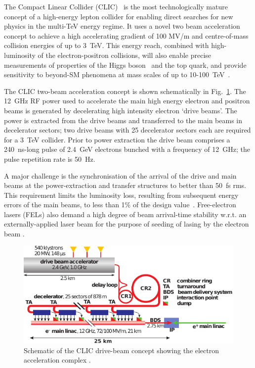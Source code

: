 \documentclass[%
 reprint,
 superscriptaddress,
 amsmath,
 amssymb,
 prl,
]{revtex4-1}
\begin{document}
The Compact Linear Collider (CLIC)~\cite{CLICCDR} is the most technologically 
mature concept of a high-energy lepton collider for enabling direct searches 
for new physics in the multi-TeV energy regime. It uses a novel two 
beam acceleration concept to achieve a high accelerating gradient of 100 MV/m 
and centre-of-mass collision energies of up to 3~TeV. This energy reach, 
combined with high-luminosity of the electron-positron collisions, will also 
enable precise measurements of properties of the Higgs boson~\cite{CLIC-Higgs} 
and the top quark, and provide sensitivity to beyond-SM phenomena at mass 
scales of up to 10-100~TeV~\cite{CLIC-staging}.

The CLIC two-beam acceleration concept is shown schematically in 
Fig.~\ref{fig:CLICLayout}. The 12~GHz RF power used to accelerate the main high 
energy electron and positron beams is generated by decelerating high intensity 
electron `drive beams'. The power is extracted from the drive beams and 
transferred to the main beams in decelerator sectors; two drive 
beams with 25 decelerator sectors each are required for a 3~TeV collider. Prior 
to power extraction the drive beam comprises a 240~ns-long pulse of 2.4~GeV 
electrons bunched with a frequency of 12~GHz; the pulse repetition rate is 
50~Hz.

A major challenge is the synchronisation of the arrival of the drive and main 
beams at the power-extraction and transfer structures to better than 50~fs rms. 
This requirement limits the luminosity loss, resulting from subsequent 
energy errors of the main beams, to less than 1\% of the design 
value~\cite{clicLumEq}. Free-electron lasers (FELs) also demand a high degree 
of beam arrival-time stability w.r.t. an externally-applied laser beam for the 
purpose of seeding of lasing by the electron beam \cite{Savelyev2017}. 

\begin{figure}
	\includegraphics[width=\columnwidth]{toSubmit/fig1}
	\caption{\label{fig:CLICLayout} Schematic of the CLIC drive-beam 
	concept showing the electron acceleration complex \cite{CLIC-staging}.
	}
\end{figure}
\end{document}
